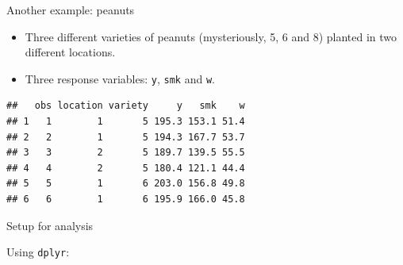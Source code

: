 \begin{frame}[fragile]{Another example: peanuts}

  \begin{itemize}
  \item  Three different varieties
of peanuts (mysteriously, 5, 6 and 8) planted in two different
locations.
\item Three response variables: \texttt{y}, \texttt{smk} and
\texttt{w}.
  \end{itemize}

 
\begin{knitrout}
\color{fgcolor}\begin{kframe}
\begin{alltt}
\hlkwb{=}\hlstd{(}\hlstd{,}
\end{alltt}
\begin{verbatim}
##   obs location variety     y   smk    w
## 1   1        1       5 195.3 153.1 51.4
## 2   2        1       5 194.3 167.7 53.7
## 3   3        2       5 189.7 139.5 55.5
## 4   4        2       5 180.4 121.1 44.4
## 5   5        1       6 203.0 156.8 49.8
## 6   6        1       6 195.9 166.0 45.8
\end{verbatim}
\end{kframe}
\end{knitrout}
    
    
\end{frame}

\begin{frame}[fragile]{Setup for analysis}

  Using \texttt{dplyr}:
 
\begin{knitrout}
\color{fgcolor}
\end{knitrout}

  
\end{frame}


